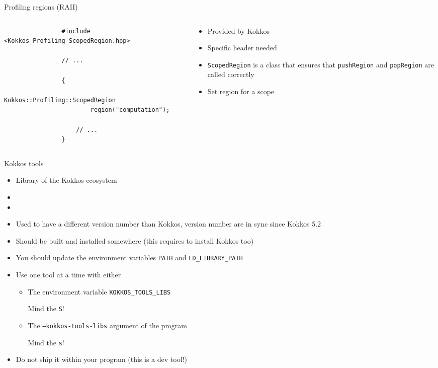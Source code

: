 \documentclass[
    aspectratio=169,
    \createHandout
]{beamer}
\begin{document}
\begin{frame}[fragile]{Profiling regions (RAII)}
    \begin{columns}
        \begin{column}{0.65\linewidth}
            \begin{verbatim}
                #include <Kokkos_Profiling_ScopedRegion.hpp>

                // ...

                {
                    Kokkos::Profiling::ScopedRegion
                        region("computation");

                    // ...
                }
            \end{verbatim}
        \end{column}
        \begin{column}{0.35\linewidth}
            \begin{itemize}
                \item Provided by Kokkos
                \item Specific header needed
                \item \texttt{ScopedRegion} is a class that ensures that \texttt{pushRegion} and \texttt{popRegion} are called correctly
                \item Set region for a scope
            \end{itemize}
        \end{column}
    \end{columns}
\end{frame}

\begin{frame}{Kokkos tools}
    \begin{itemize}
        \item Library of the Kokkos ecosystem
        \item {}
        \item {}
        \item Used to have a different version number than Kokkos, version number are in sync since Kokkos 5.2
        \item Should be built and installed somewhere (this requires to install Kokkos too)
        \item You should update the environment variables \texttt{PATH} and \texttt{LD\_LIBRARY\_PATH}
        \item Use one tool at a time with either
        \begin{itemize}
            \item The environment variable \texttt{KOKKOS\_TOOLS\_LIBS}

            Mind the \texttt{S}!
            \item The \texttt{--kokkos-tools-libs} argument of the program

            Mind the \texttt{s}!
        \end{itemize}
        \item Do not ship it within your program (this is a dev tool!)
    \end{itemize}
\end{frame}
\end{document}
